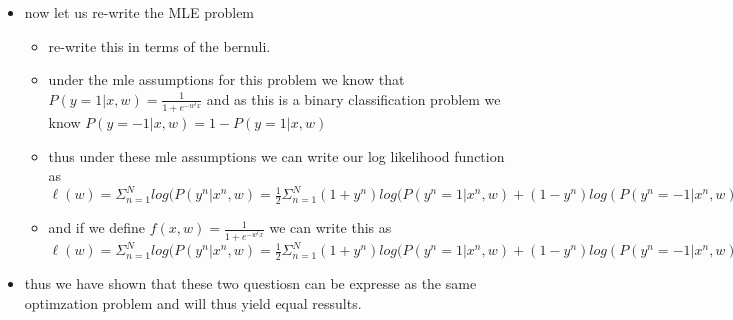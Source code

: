 \documentclass{article}
\theoremstyle{plain}
\theoremstyle{definition}
\begin{document}
\begin{enumerate}
\begin{itemize}
\begin{itemize}
    $\hat{w}=argmin_{w\in \mathbb{R}^{d}}\frac{1}{2N}\Sigma_{n=1}^{N}(1+y^n)log(1+e^{-w^tx^n})+(1-y^n)log(1+e^{w^tx^n})=argmin_{w\in \mathbb{R}^{d}}\frac{1}{2N}\Sigma_{n=1}^{N}(1+y^n)log(g(w^tx^n))+(1-y^n)log(g(-w^tx^n))=argmax_{w\in \mathbb{R}^{d}}\frac{1}{2N}\Sigma_{n=1}^{N}(1+y^n)log(f(w^tx^n))+(1-y^n)log(-f(wx^n))=argmax_{w\in \mathbb{R}^{d}}\frac{1}{2N}\Sigma_{n=1}^{N}(1+y^n)log(f(w^tx^n))+(1-y^n)log(1-f(wx^n))$


    \item alterantivly we can explicity write $\hat{w}=argmin_{w\in \mathbb{R}^{d}}\frac{1}{2N}\Sigma_{n=1}^{N}(1+y^n)log(1+e^{-w^tx^n})+(1-y^n)log(1+e^{w^tx^n})=argmax_{w\in \mathbb{R}^{d}}\frac{1}{2N}\Sigma_{n=1}^{N}(1+y^n)log(\frac{1}{1+e^{-w^tx^n}}(1-y^n)log(\frac{1}{1+e^{w^tx^n}})$
    \item then taking the partial with respect to one componetn of the weigth vector we get $\frac{1}{2m}\Sigma_{n=1}^{N}\frac{(1-y^{n})e^{w^tx^n}x}{1+e^{w^tx^n}}-\frac{(1+y^{n})e^{-w^tx^n}x}{1+e^{-w^tx^n}}=x[(1-y^n)((1-]$

    
    \end{itemize}
    \item now let us re-write the MLE problem 
    \begin{itemize}
    \item re-write this in terms of the bernuli. 
        \item under the mle assumptions for this problem we know that $P(y=1|x,w)=\frac{1}{1+e^{-w^tx}}$ and as this is a binary classification problem we know $P(y=-1|x,w)=1-P(y=1|x,w)$
        \item thus under these mle assumptions we can write our log likelihood function as $\ell(w)=\Sigma_{n=1}^{N}log(P(y^n|x^n,w)=\frac{1}{2}\Sigma_{n=1}^{N}(1+y^n)log(P(y^n=1|x^n,w)+(1-y^n)log(P(y^n=-1|x^n,w))=\frac{1}{2}\Sigma_{n=1}^{N}(1+y^n)log(P(y^n=1|x^n,w)+(1-y^n)log(1-P(y^n=1|x^n,w))$
        \item and if we define $f(x,w)=\frac{1}{1+e^{-w^tx}}$ we can write this as 
         $\ell(w)=\Sigma_{n=1}^{N}log(P(y^n|x^n,w)=\frac{1}{2}\Sigma_{n=1}^{N}(1+y^n)log(P(y^n=1|x^n,w)+(1-y^n)log(P(y^n=-1|x^n,w))=\frac{1}{2}\Sigma_{n=1}^{N}(1+y^n)log(P(y^n=1|x^n,w)+(1-y^n)log(1-P(y^n=1|x^n,w))=\frac{1}{2}\Sigma_{n=1}^{N}(1+y^n)log(f(x,w))+(1-y^n)log(1-f(x))$
    \end{itemize}
    \item thus we have shown that these two questiosn can be expresse as the same optimzation problem and will thus yield equal ressults. 
\end{itemize}
\end{enumerate}
\end{document}
